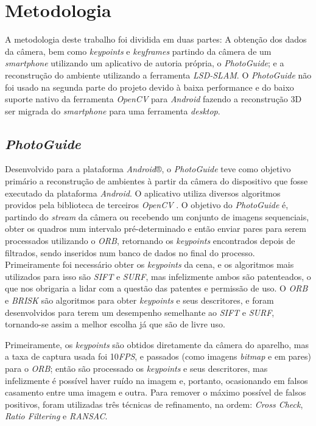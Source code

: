 \chapter{Metodologia}

A metodologia deste trabalho foi dividida em duas partes: A obtenção dos dados da câmera, bem como \textit{keypoints} e \textit{keyframes} partindo da câmera de um \textit{smartphone} utilizando um aplicativo de autoria própria, o \textit{PhotoGuide}; e a reconstrução do ambiente utilizando a ferramenta \textit{LSD-SLAM}. O \textit{PhotoGuide} não foi usado na segunda parte do projeto devido à baixa performance e do baixo suporte nativo da ferramenta \textit{OpenCV} para \textit{Android} fazendo a reconstrução 3D ser migrada do \textit{smartphone} para uma ferramenta \textit{desktop}.


\section{\textit{PhotoGuide}}

Desenvolvido para a plataforma \textit{Android}®, o \textit{PhotoGuide} \cite{PhotoGuide} teve como objetivo primário a reconstrução de ambientes à partir da câmera do dispositivo que fosse executado da plataforma \textit{Android}. O aplicativo utiliza diversos algoritmos providos pela biblioteca de terceiros \textit{OpenCV} \cite{OpenCV}. O objetivo do \textit{PhotoGuide} é, partindo do \textit{stream} da câmera ou recebendo um conjunto de imagens sequenciais, obter os quadros num intervalo pré-determinado e então enviar pares para serem processados utilizando o \textit{ORB}, retornando os \textit{keypoints} encontrados depois de filtrados, sendo inseridos num banco de dados no final do processo.  Primeiramente foi necessário obter os \textit{keypoints} da cena, e os algoritmos mais utilizados para isso são \textit{SIFT} e \textit{SURF}, mas infelizmente ambos são patenteados, o que nos obrigaria a lidar com a questão das patentes e permissão de uso. O \textit{ORB} e \textit{BRISK} são algoritmos para obter \textit{keypoints} e seus descritores, e foram desenvolvidos para terem um desempenho semelhante ao \textit{SIFT} e\textit{ SURF}, tornando-se assim a melhor escolha já que são de livre uso.

Primeiramente, os \textit{keypoints} são obtidos diretamente da câmera do aparelho, mas a taxa de captura usada foi 10\textit{FPS}, e passados (como imagens \textit{bitmap} e em pares) para o \textit{ORB}; então são processado os \textit{keypoints} e seus descritores, mas infelizmente é possível haver ruído na imagem e, portanto, ocasionando em falsos casamento entre uma imagem e outra. Para remover o máximo possível de falsos positivos, foram utilizadas três técnicas de refinamento, na ordem: \textit{Cross Check}, \textit{Ratio Filtering} e \textit{RANSAC}.

